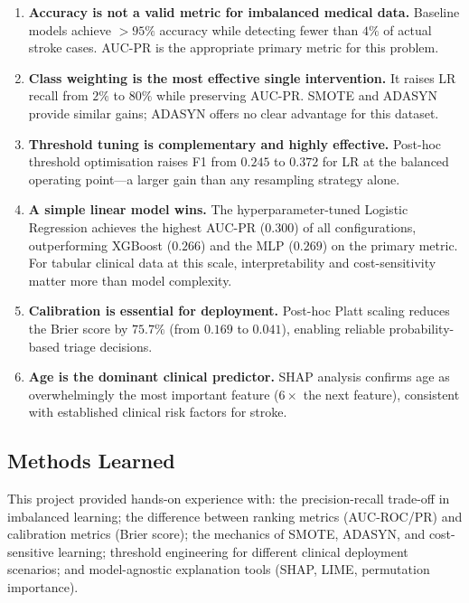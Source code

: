 \documentclass[11pt,a4paper]{article}
\begin{document}
\begin{enumerate}
  \item \textbf{Accuracy is not a valid metric for imbalanced medical data.}
        Baseline models achieve $>95\%$ accuracy while detecting fewer than $4\%$ of actual stroke cases.
        AUC-PR is the appropriate primary metric for this problem.

  \item \textbf{Class weighting is the most effective single intervention.}
        It raises LR recall from $2\%$ to $80\%$ while preserving AUC-PR.
        SMOTE and ADASYN provide similar gains; ADASYN offers no clear advantage for this dataset.

  \item \textbf{Threshold tuning is complementary and highly effective.}
        Post-hoc threshold optimisation raises F1 from $0.245$ to $0.372$ for LR at the balanced operating point—a larger gain than any resampling strategy alone.

  \item \textbf{A simple linear model wins.}
        The hyperparameter-tuned Logistic Regression achieves the highest AUC-PR ($0.300$) of all configurations, outperforming XGBoost ($0.266$) and the MLP ($0.269$) on the primary metric.
        For tabular clinical data at this scale, interpretability and cost-sensitivity matter more than model complexity.

  \item \textbf{Calibration is essential for deployment.}
        Post-hoc Platt scaling reduces the Brier score by $75.7\%$ (from $0.169$ to $0.041$), enabling reliable probability-based triage decisions.

  \item \textbf{Age is the dominant clinical predictor.}
        SHAP analysis confirms age as overwhelmingly the most important feature ($6\times$ the next feature), consistent with established clinical risk factors for stroke.
\end{enumerate}

\subsection{Methods Learned}

This project provided hands-on experience with: the precision-recall trade-off in imbalanced learning; the difference between ranking metrics (AUC-ROC/PR) and calibration metrics (Brier score); the mechanics of SMOTE, ADASYN, and cost-sensitive learning; threshold engineering for different clinical deployment scenarios; and model-agnostic explanation tools (SHAP, LIME, permutation importance).
\end{document}
